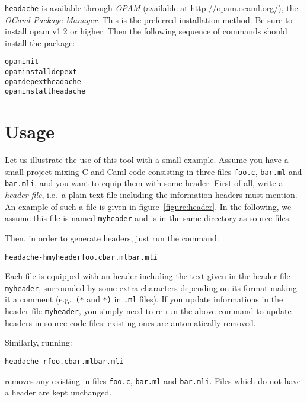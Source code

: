 \documentclass{article}
\newcommand{\mytt}[1]{\texttt{#1}}
\newcommand{\headache}{\mytt{headache}}
\begin{document}
\headache{} is available through \emph{OPAM} (available at
\url{http://opam.ocaml.org/}), the \emph{OCaml Package Manager}.
This is the preferred installation method.
Be sure to install opam v1.2 or higher.
Then the following sequence of commands should install the package:
\begin{alltt}
  opam init
  opam install depext
  opam depext headache
  opam install headache
\end{alltt}

\section{Usage}

Let us illustrate the use of this tool with a small example.  Assume
you have a small project mixing C and Caml code consisting in three
files \mytt{foo.c}, \mytt{bar.ml} and \mytt{bar.mli}, and you want to
equip them with some header.  First of all, write a \emph{header
  file}, i.e.\ a plain text file including the information headers
must mention.  An example of such a file is given in
figure~\ref{figure:header}.  In the following, we assume this file is
named \mytt{myheader} and is in the same directory as source files.

Then, in order to generate headers, just run the command:
\begin{alltt}
  headache -h myheader foo.c bar.ml bar.mli
\end{alltt}
Each file is equipped with an header including the text given in the
header file \mytt{myheader}, surrounded by some extra characters
depending on its format making it a comment (e.g.\ \mytt{(*} and
\mytt{*)} in \mytt{.ml} files).  If you update informations in the
header file \mytt{myheader}, you simply need to re-run the above
command to update headers in source code files: existing ones are
automatically removed.

Similarly, running:
\begin{alltt}
  headache -r foo.c bar.ml bar.mli
\end{alltt}
removes any existing in files \mytt{foo.c}, \mytt{bar.ml} and
\mytt{bar.mli}.  Files which do not have a header are kept unchanged.
\end{document}
